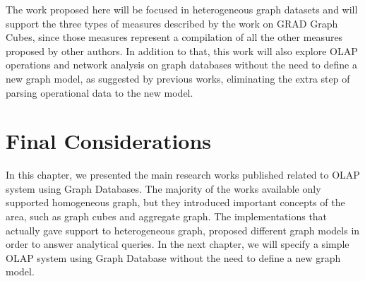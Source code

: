 The work proposed here will be focused in heterogeneous graph datasets and will support the three types of measures described by the work on GRAD Graph Cubes, since those measures represent a compilation of all the other measures proposed by other authors. In addition to that, this work will also explore OLAP operations and network analysis on graph databases without the need to define a new graph model, as suggested by previous works, eliminating the extra step of parsing operational data to the new model.

\section{Final Considerations}

In this chapter, we presented the main research works published related to OLAP system using Graph Databases. The majority of the works available only supported homogeneous graph, but they introduced important concepts of the area, such as graph cubes and aggregate graph. The implementations that actually gave support to heterogeneous graph, proposed different graph models in order to answer analytical queries. In the next chapter, we will specify a simple OLAP system using Graph Database without the need to define a new graph model.
